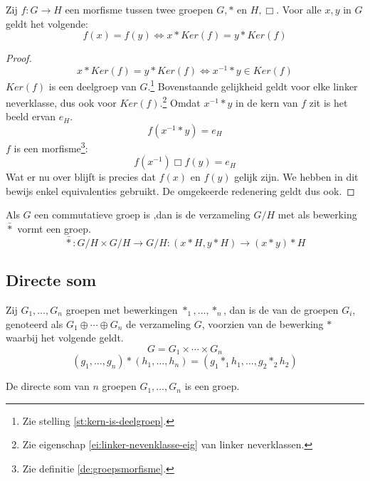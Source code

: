 \documentclass[main.tex]{subfiles}
\begin{document}
\begin{st}
  Zij $f: G \rightarrow H$ een morfisme tussen twee groepen $G,*$ en $H,\Box$. Voor alle $x,y$ in $G$ geldt het volgende:
  \[ f(x) = f(y) \Leftrightarrow x * Ker(f) = y * Ker(f) \]

  \begin{proof}
    \[ x * Ker(f) = y * Ker(f) \Leftrightarrow x^{-1} * y \in Ker(f) \]
    $Ker(f)$ is een deelgroep van $G$.\footnote{Zie stelling \ref{st:kern-is-deelgroep}.}
    Bovenstaande gelijkheid geldt voor elke linker neverklasse, dus ook voor $Ker(f)$.\footnote{Zie eigenschap \ref{ei:linker-nevenklasse-eig} van linker neverklassen.}
    Omdat $x^{-1} * y$ in de kern van $f$ zit is het beeld ervan $e_{H}$.
    \[ f(x^{-1} * y) = e_{H} \]
    $f$ is een morfisme\footnote{Zie definitie \ref{de:groepsmorfisme}.}:
    \[ f(x^{-1}) \Box f(y) = e_{H}\]
    Wat er nu over blijft is precies dat $f(x)$ en $f(y)$ gelijk zijn.
    We hebben in dit bewijs enkel equivalenties gebruikt. De omgekeerde redenering geldt dus ook.
  \end{proof}
\end{st}


\begin{st}
  Als $G$ een commutatieve groep is ,dan is de verzameling $G/H$ met als bewerking $\bar{*}$ vormt een groep.
  \[ \bar{*}: G/H \times G/H \rightarrow G/H: (x*H,y*H) \rightarrow (x*y)*H \]

\end{st}


\subsection{Directe som}
\label{sec:directe-som}

\begin{de}
  Zij $G_{1},\dotsc,G_{n}$ groepen met bewerkingen $*_{1},\dotsc,*_{n}$, dan is de  van de groepen $G_{i}$, genoteerd als $G_{1} \oplus \dotsb \oplus G_{n}$ de verzameling $G$, voorzien van de bewerking $*$ waarbij het volgende geldt.
  \[
  G = G_{1} \times \dotsb \times G_{n}
  \]
  \[
  (g_{1},\dotsc,g_{n}) *(h_{1},\dotsc,h_{n}) = (g_{1} *_{1} h_{1}, \dotsc, g_{2} *_{2} h_{2})
  \]
\end{de}

\begin{st}
  De directe som van $n$ groepen $G_{1},\dotsc,G_{n}$ is een groep.

\end{st}
\end{document}
